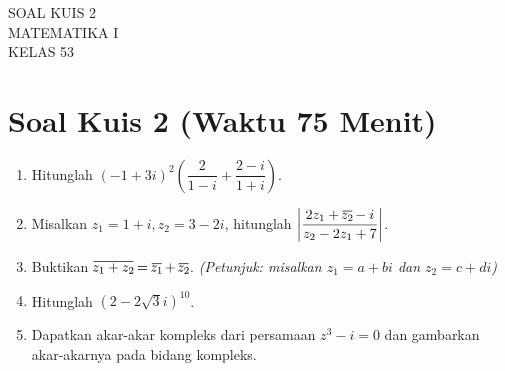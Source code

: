 \documentclass{article}
\begin{document}
 \begin{titlepage}
    \vspace*{\fill}
    \begin{center}
      \Huge {SOAL KUIS 2\\MATEMATIKA I \\KELAS 53}
    \end{center}
    \vspace*{\fill}
  \end{titlepage}
\makeatletter
\renewcommand*\env@matrix[1][*\c@MaxMatrixCols c]{%
  \hskip -\arraycolsep
  \let\@ifnextchar\new@ifnextchar
  \array{#1}}
\makeatother
\newcount\arrowcount
\newcommand\arrows[1]{
        \global\arrowcount#1
        \ifnum\arrowcount>0
                \begin{matrix}[c]
                \expandafter\nextarrow
        \fi
}

\newcommand\nextarrow[1]{
        \global\advance\arrowcount-1
        \ifx\relax#1\relax\else \xrightarrow{#1}\fi
        \ifnum\arrowcount=0
                \end{matrix}
        \else
                \\
                \expandafter\nextarrow
        \fi
}
\newcommand*\oline[1]{%
  \vbox{%
    \hrule height 0.5pt%
    \kern0.25ex%
    \hbox{%
      \kern-0.1em%
      \ifmmode#1\else\ensuremath{#1}\fi%
      \kern-0.1em%
    }%
  }%
}
\newpage
{}
\section*{Soal Kuis 2 (Waktu 75 Menit)}
\begin{enumerate}
	\item Hitunglah $(-1+3i)^2 \left(\dfrac{2}{1-i}+\dfrac{2-i}{1+i}\right)$.
	\item Misalkan $z_1=1+i, z_2=3-2i$, hitunglah $\left|\dfrac{2z_1+\oline{z_2}-i}{z_2-2z_1+7}\right|$.
	\item Buktikan $\oline{z_1+z_2}=\oline{z_1}+\oline{z_2}$. \textit{(Petunjuk: misalkan $z_1=a+bi$ dan $z_2=c+di$)}
	\item Hitunglah $(2-2\sqrt{3}i)^{10}$.
	\item Dapatkan akar-akar kompleks dari persamaan $z^3-i=0$ dan gambarkan akar-akarnya pada bidang kompleks.
\end{enumerate}
\end{document}
